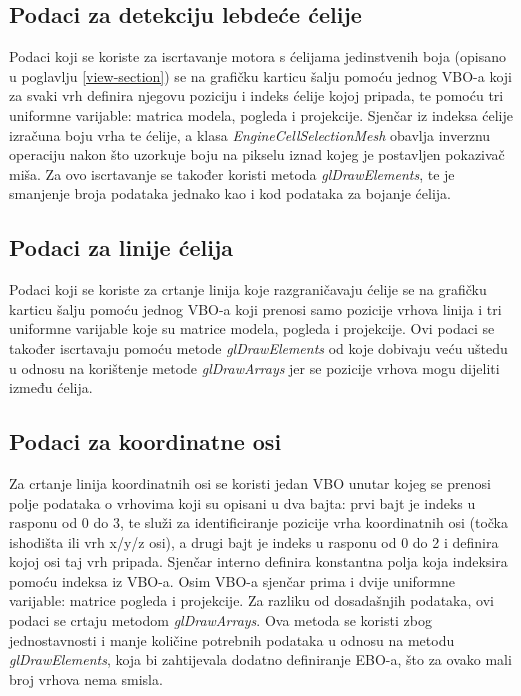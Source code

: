 \documentclass[times, utf8, diplomski]{fer}
\begin{document}
\subsection{Podaci za detekciju lebdeće ćelije}

Podaci koji se koriste za iscrtavanje motora s ćelijama jedinstvenih boja (opisano u poglavlju \ref{view-section}) se na grafičku karticu šalju pomoću jednog VBO-a koji za svaki vrh definira njegovu poziciju i indeks ćelije kojoj pripada, te pomoću tri uniformne varijable: matrica modela, pogleda i projekcije. Sjenčar iz indeksa ćelije izračuna boju vrha te ćelije, a klasa \textit{EngineCellSelectionMesh} obavlja inverznu operaciju nakon što uzorkuje boju na pikselu iznad kojeg je postavljen pokazivač miša. Za ovo iscrtavanje se također koristi metoda \textit{glDrawElements}, te je smanjenje broja podataka jednako kao i kod podataka za bojanje ćelija.

\subsection{Podaci za linije ćelija}

Podaci koji se koriste za crtanje linija koje razgraničavaju ćelije se na grafičku karticu šalju pomoću jednog VBO-a koji prenosi samo pozicije vrhova linija i tri uniformne varijable koje su matrice modela, pogleda i projekcije. Ovi podaci se također iscrtavaju pomoću metode \textit{glDrawElements} od koje dobivaju veću uštedu u odnosu na korištenje metode \textit{glDrawArrays} jer se pozicije vrhova mogu dijeliti između ćelija.

\subsection{Podaci za koordinatne osi}
Za crtanje linija koordinatnih osi se koristi jedan VBO unutar kojeg se prenosi polje podataka o vrhovima koji su opisani u dva bajta: prvi bajt je indeks u rasponu od 0 do 3, te služi za identificiranje pozicije vrha koordinatnih osi (točka ishodišta ili vrh x/y/z osi), a drugi bajt je indeks u rasponu od 0 do 2 i definira kojoj osi taj vrh pripada. Sjenčar interno definira konstantna polja koja indeksira pomoću indeksa iz VBO-a. Osim VBO-a sjenčar prima i dvije uniformne varijable: matrice pogleda i projekcije. Za razliku od dosadašnjih podataka, ovi podaci se crtaju metodom \textit{glDrawArrays}. Ova metoda se koristi zbog jednostavnosti i manje količine potrebnih podataka u odnosu na metodu \textit{glDrawElements}, koja bi zahtijevala dodatno definiranje EBO-a, što za ovako mali broj vrhova nema smisla.
\end{document}
